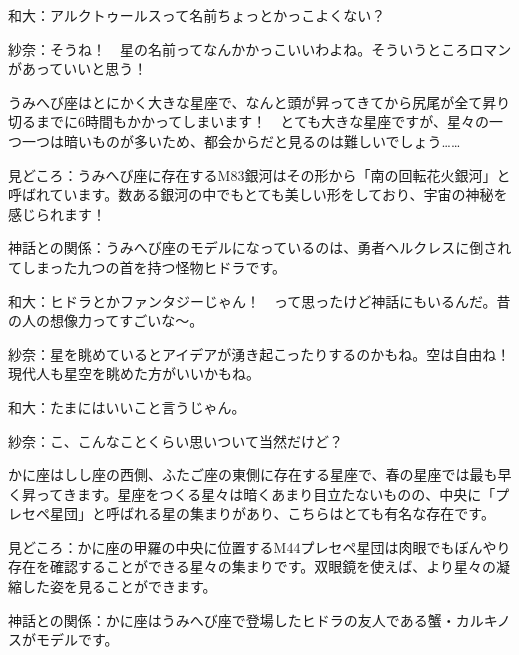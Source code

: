 \documentclass[../../super_nova_2023]{subfiles}
\begin{document}
\phantom{a}\par
和大：アルクトゥールスって名前ちょっとかっこよくない？　


\phantom{a}\par
紗奈：そうね！　星の名前ってなんかかっこいいわよね。そういうところロマンがあっていいと思う！


\phantom{a}\par
{}
{}
\begin{tcolorbox}[title=4. うみへび座, breakable]
	うみへび座はとにかく大きな星座で、なんと頭が昇ってきてから尻尾が全て昇り切るまでに6時間もかかってしまいます！　とても大きな星座ですが、星々の一つ一つは暗いものが多いため、都会からだと見るのは難しいでしょう……
	
	
	\phantom{a}\par
	見どころ：うみへび座に存在するM83銀河はその形から「南の回転花火銀河」と呼ばれています。数ある銀河の中でもとても美しい形をしており、宇宙の神秘を感じられます！
	
	
	\phantom{a}\par
	神話との関係：うみへび座のモデルになっているのは、勇者ヘルクレスに倒されてしまった九つの首を持つ怪物ヒドラです。  
\end{tcolorbox}

\phantom{a}\par
和大：ヒドラとかファンタジーじゃん！　って思ったけど神話にもいるんだ。昔の人の想像力ってすごいな〜。


\phantom{a}\par
紗奈：星を眺めているとアイデアが湧き起こったりするのかもね。空は自由ね！　現代人も星空を眺めた方がいいかもね。


\phantom{a}\par
和大：たまにはいいこと言うじゃん。


\phantom{a}\par
紗奈：こ、こんなことくらい思いついて当然だけど？


\phantom{a}\par
{}
{}
\begin{tcolorbox}[title=5. かに座, breakable]
	かに座はしし座の西側、ふたご座の東側に存在する星座で、春の星座では最も早く昇ってきます。星座をつくる星々は暗くあまり目立たないものの、中央に「プレセペ星団」と呼ばれる星の集まりがあり、こちらはとても有名な存在です。
	
	
	\phantom{a}\par
	見どころ：かに座の甲羅の中央に位置するM44プレセペ星団は肉眼でもぼんやり存在を確認することができる星々の集まりです。双眼鏡を使えば、より星々の凝縮した姿を見ることができます。
	
	
	\phantom{a}\par
	神話との関係：かに座はうみへび座で登場したヒドラの友人である蟹・カルキノスがモデルです。  
\end{tcolorbox}
\end{document}
